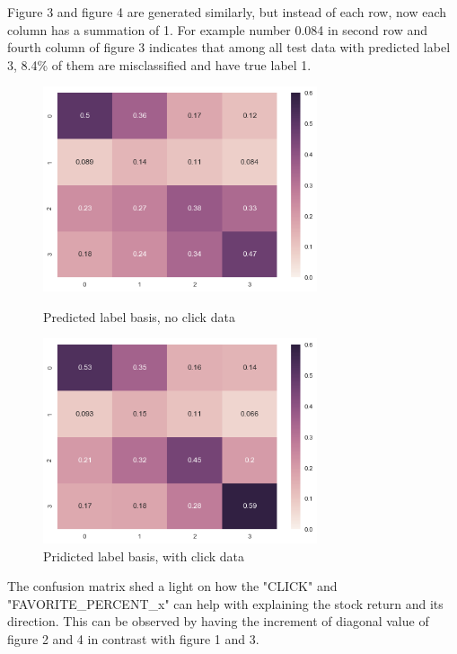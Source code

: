 \documentclass[letterpaper]{article}
\begin{document}
Figure 3 and figure 4 are generated similarly, but instead of each row, now each column has a summation of 1. For example number 0.084 in second row and fourth column of figure 3 indicates that among all test data with predicted label 3, 8.4\% of them are misclassified and have true label 1.

\begin{figure}[htbp]
  \begin{minipage}[t]{0.5\linewidth}
  \centering
  \includegraphics[width=0.72\textwidth]{pic4_heatmap_noclick.png}
  \caption{Predicted label basis, no click data}
  \end{minipage}
  \begin{minipage}[t]{0.5\linewidth}
  \centering
  \includegraphics[width=0.72\textwidth]{pic3_heatmap_hasclick.png}
  \caption{Pridicted label basis, with click data}
  \end{minipage}
\end{figure}

The confusion matrix shed a light on how the "CLICK" and "FAVORITE\_PERCENT\_x" can help with explaining the stock return and its direction. This can be observed by having the increment of diagonal value of figure 2 and 4 in contrast with figure 1 and 3. 
\end{document}
